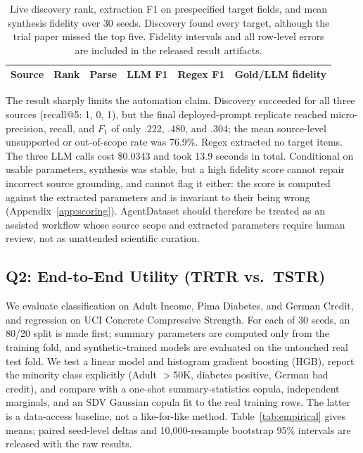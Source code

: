\documentclass[letterpaper]{article} %
\begin{document}
\begin{table}[t]
\centering
\scriptsize
\setlength{\tabcolsep}{3pt}
\begin{tabular}{lrrrrr}
\toprule
Source & Rank & Parse & LLM F1 & Regex F1 & Gold/LLM fidelity \\
\midrule
%
\end{tabular}
\caption{Live discovery rank, extraction F1 on prespecified target fields, and
mean synthesis fidelity over 30 seeds. Discovery found every target, although
the trial paper missed the top five. Fidelity intervals and all row-level
errors are included in the released result artifacts.}
\label{tab:realpapers}
\end{table}

The result sharply limits the automation claim. Discovery succeeded for all
three sources (recall@5: 1, 0, 1), but the final deployed-prompt replicate
reached micro-precision, recall, and $F_1$ of only .222, .480, and .304;
the mean source-level unsupported or out-of-scope rate was 76.9\%. Regex
extracted no target items. The three LLM calls cost \$0.0343 and took 13.9
seconds in total. Conditional on usable
parameters, synthesis was stable, but a high fidelity score cannot repair
incorrect source grounding, and cannot flag it either: the score is computed
against the extracted parameters and is invariant to their being wrong
(Appendix~\ref{app:scoring}). AgentDataset should therefore be treated as
an assisted workflow whose source scope and extracted parameters require human
review, not as unattended scientific curation.

\subsection{Q2: End-to-End Utility (TRTR vs.\ TSTR)}
We evaluate classification on Adult Income, Pima Diabetes, and German Credit,
and regression on UCI Concrete Compressive Strength. For each of 30 seeds, an
80/20 split is made first; summary parameters are computed only from the
training fold, and synthetic-trained models are evaluated on the untouched real
test fold. We test a linear model and histogram gradient boosting (HGB), report
the minority class explicitly (Adult $>$50K, diabetes positive, German bad
credit), and compare with a one-shot summary-statistics copula, independent
marginals, and an SDV Gaussian copula fit to the real training rows. The latter is a data-access baseline, not a
like-for-like method. Table~\ref{tab:empirical} gives means; paired seed-level
deltas and 10,000-resample bootstrap 95\% intervals are released with the raw
results.
\end{document}
